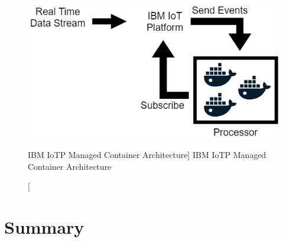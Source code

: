 \begin{figure}[ht]
    \includegraphics[width=0.6\linewidth]{images/streaming/containerArch.png}\centering
    \caption
    [IBM IoTP Managed Container Architecture]
    {IBM IoTP Managed Container Architecture}
    \label{fig:iotpManagedContainer}
\end{figure}


\section{Summary}
